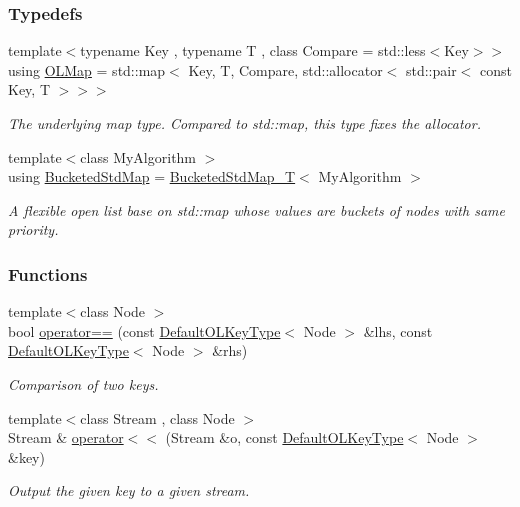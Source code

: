 \subsubsection*{Typedefs}
\begin{DoxyCompactItemize}
\item 
{\footnotesize template$<$typename Key , typename T , class Compare  = std\+::less$<$\+Key$>$$>$ }\\using \hyperlink{namespaceslb_1_1ext_1_1policy_1_1openList_ae328455bada2886ad728a9f54bfa1f6a}{O\+L\+Map} = std\+::map$<$ Key, T, Compare, std\+::allocator$<$ std\+::pair$<$ const Key, T $>$$>$$>$
\begin{DoxyCompactList}\small\item\em The underlying map type. Compared to std\+::map, this type fixes the allocator. \end{DoxyCompactList}\item 
{\footnotesize template$<$class My\+Algorithm $>$ }\\using \hyperlink{namespaceslb_1_1ext_1_1policy_1_1openList_af51e9574befd1fada8e2695f7acb83b8}{Bucketed\+Std\+Map} = \hyperlink{structslb_1_1ext_1_1policy_1_1openList_1_1BucketedStdMap__T}{Bucketed\+Std\+Map\+\_\+T}$<$ My\+Algorithm $>$
\begin{DoxyCompactList}\small\item\em A flexible open list base on {\ttfamily std\+::map} whose values are buckets of nodes with same priority. \end{DoxyCompactList}\end{DoxyCompactItemize}
\subsubsection*{Functions}
\begin{DoxyCompactItemize}
\item 
{\footnotesize template$<$class Node $>$ }\\bool \hyperlink{namespaceslb_1_1ext_1_1policy_1_1openList_a2c6edf71e8c589936199f80fdcbf0d87}{operator==} (const \hyperlink{structslb_1_1ext_1_1policy_1_1openList_1_1DefaultOLKeyType}{Default\+O\+L\+Key\+Type}$<$ Node $>$ \&lhs, const \hyperlink{structslb_1_1ext_1_1policy_1_1openList_1_1DefaultOLKeyType}{Default\+O\+L\+Key\+Type}$<$ Node $>$ \&rhs)
\begin{DoxyCompactList}\small\item\em Comparison of two keys. \end{DoxyCompactList}\item 
{\footnotesize template$<$class Stream , class Node $>$ }\\Stream \& \hyperlink{namespaceslb_1_1ext_1_1policy_1_1openList_a6b1e0c2d8b4051676686357801771250}{operator$<$$<$} (Stream \&o, const \hyperlink{structslb_1_1ext_1_1policy_1_1openList_1_1DefaultOLKeyType}{Default\+O\+L\+Key\+Type}$<$ Node $>$ \&key)
\begin{DoxyCompactList}\small\item\em Output the given key to a given stream. \end{DoxyCompactList}\end{DoxyCompactItemize}


